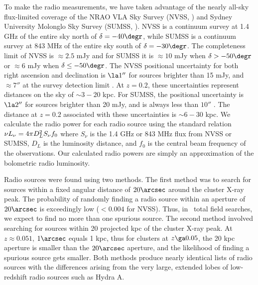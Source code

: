 \documentclass[12pt,preprint]{aastex}
\begin{document}
To make the radio measurements, we have taken advantage of the nearly
all-sky flux-limited coverage of the NRAO VLA Sky Survey (NVSS,
\citealt{nvss}) and Sydney University Molonglo Sky Survey (SUMSS,
\citealt{sumss1, sumss2}). NVSS is a continuum survey at 1.4 GHz of
the entire sky north of $\delta = -40\degr$, while SUMSS is a
continuum survey at 843 MHz of the entire sky south of $\delta =
-30\degr$. The completeness limit of NVSS is $\approx 2.5$ mJy and for
SUMSS it is $\approx 10$ mJy when $\delta > -50\degr$ or $\approx 6$
mJy when $\delta \leq -50\degr$. The NVSS positional uncertainty for
both right ascension and declination is $\la 1''$ for sources brighter
than 15 mJy, and $\approx 7''$ at the survey detection limit
\citep{nvss}. At $z=0.2$, these uncertainties represent distances on
the sky of $\sim3-20$ kpc. For SUMSS, the positional uncertainty is
$\la 2''$ for sources brighter than 20 mJy, and is always less than
$10''$ \citep{sumss1,sumss2}. The distance at $z=0.2$ associated with
these uncertainties is $\sim6-30$ kpc. We calculate the radio power
for each radio source using the standard relation $\nu L_{\nu} = 4 \pi
D_L^2 S_{\nu} f_0$ where $S_{\nu}$ is the 1.4 GHz or 843 MHz flux from
NVSS or SUMSS, $D_L$ is the luminosity distance, and $f_0$ is the
central beam frequency of the observations. Our calculated radio
powers are simply an approximation of the bolometric radio luminosity.

Radio sources were found using two methods. The first method was to
search for sources within a fixed angular distance of $20\arcsec$
around the cluster X-ray peak. The probability of randomly finding a
radio source within an aperture of $20\arcsec$ is exceedingly low ($<
0.004$ for NVSS). Thus, in \clnum\ total field searches, we expect to
find no more than one spurious source. The second method involved
searching for sources within 20 projected kpc of the cluster X-ray
peak. At $z \approx 0.051$, $1\arcsec$ equals 1 kpc, thus for clusters
at $z \ga 0.05$, the 20 kpc aperture is smaller than the $20\arcsec$
aperture, and the likelihood of finding a spurious source gets
smaller. Both methods produce nearly identical lists of radio sources
with the differences arising from the very large, extended lobes of
low-redshift radio sources such as Hydra A.
\end{document}
